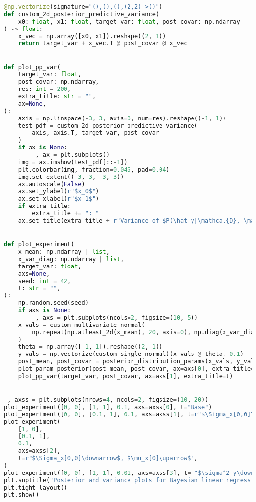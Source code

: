 \documentclass[11pt]{article} %
\begin{document}
\begin{lstlisting}[language=Python]
@np.vectorize(signature="(),(),(),(2,2)->()")
def custom_2d_posterior_predictive_variance(
    x0: float, x1: float, target_var: float, post_covar: np.ndarray
) -> float:
    x_vec = np.array([x0, x1]).reshape((2, 1))
    return target_var + x_vec.T @ post_covar @ x_vec


def plot_pp_var(
    target_var: float,
    post_covar: np.ndarray,
    res: int = 200,
    extra_title: str = "",
    ax=None,
):
    axis = np.linspace(-3, 3, axis=0, num=res).reshape((-1, 1))
    test_pdf = custom_2d_posterior_predictive_variance(
        axis, axis.T, target_var, post_covar
    )
    if ax is None:
        _, ax = plt.subplots()
    img = ax.imshow(test_pdf[::-1])
    plt.colorbar(img, fraction=0.046, pad=0.04)
    img.set_extent((-3, 3, -3, 3))
    ax.autoscale(False)
    ax.set_ylabel(r"$x_0$")
    ax.set_xlabel(r"$x_1$")
    if extra_title:
        extra_title += ": "
    ax.set_title(extra_title + r"Variance of $P(\hat y|\mathcal{D}, \mathbf{x})$")


def plot_experiment(
    x_mean: np.ndarray | list,
    x_var_diag: np.ndarray | list,
    target_var: float,
    axs=None,
    seed: int = 42,
    t: str = "",
):
    np.random.seed(seed)
    if axs is None:
        _, axs = plt.subplots(ncols=2, figsize=(10, 5))
    x_vals = custom_multivariate_normal(
        np.repeat(np.atleast_2d(x_mean), 20, axis=0), np.diag(x_var_diag) ** 0.5
    )
    theta = np.array([-1, 1]).reshape((2, 1))
    y_vals = np.vectorize(custom_single_normal)(x_vals @ theta, 0.1)
    post_mean, post_covar = posterior_distribution_params(x_vals, y_vals, target_var)
    plot_param_posterior(post_mean, post_covar, ax=axs[0], extra_title=t)
    plot_pp_var(target_var, post_covar, ax=axs[1], extra_title=t)


_, axss = plt.subplots(nrows=4, ncols=2, figsize=(10, 20))
plot_experiment([0, 0], [1, 1], 0.1, axs=axss[0], t="Base")
plot_experiment([0, 0], [0.1, 1], 0.1, axs=axss[1], t=r"$\Sigma_x[0,0]\downarrow$")
plot_experiment(
    [1, 0],
    [0.1, 1],
    0.1,
    axs=axss[2],
    t=r"$\Sigma_x[0,0]\downarrow$, $\mu_x[0]\uparrow$",
)
plot_experiment([0, 0], [1, 1], 0.01, axs=axss[3], t=r"$\sigma^2_y\downarrow$")
plt.suptitle("Posterior and variance plots for Bayesian linear regression models")
plt.tight_layout()
plt.show()
\end{lstlisting}
\end{document}
